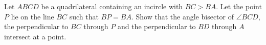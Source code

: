 Let $ABCD$ be a quadrilateral containing an incircle with $BC>BA$.
Let the point $P$ lie on the line $BC$ such that $BP=BA$.
Show that the angle bisector of $\angle BCD$, the perpendicular to $BC$ through $P$ and
the perpendicular to $BD$ through $A$ intersect at a point.